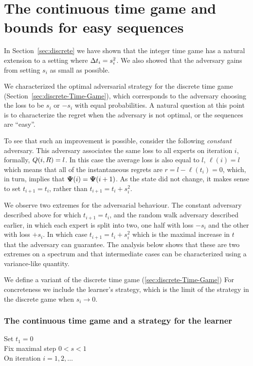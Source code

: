 \documentclass{article}[12pt]
\begin{document}
\section{The continuous time game and bounds for easy sequences} \label{sec:easy}
In Section~\ref{sec:discrete} we have shown that the integer time game
has a natural extension to a setting where $\Delta t_i = s_i^2$. We
also showed that the adversary gains from setting $s_i$ as small as
possible.

We characterized the optimal adversarial strategy for the discrete
time game (Section~\ref{sec:discrete-Time-Game}), which corresponds
to the adversary choosing the loss to be $s_i$ or $-s_i$ with equal
probabilities. A natural question at this point is to characterize the
regret when the adversary is not optimal, or the sequences are ``easy''.

To see that such an improvement is possible, consider the following
{\em constant} adversary. This adversary associates the same loss to
all experts on iteration $i$, formally, $Q(i,R) = l$. In this
case the average loss is also equal to $l$, $\ell(i)=l$ which means
that all of the instantaneous regrets are $r=l-\ell(t_i) = 0$, which,
in turn, implies that ${\bf \Psi}(i) = {\bf \Psi}(i+1)$. As the state did not
change, it makes sense to set $t_{i+1}=t_i$, rather than
$t_{i+1}=t_i+s_i^2$.

We observe two extremes for the adversarial behaviour. The constant
adversary described above for which $t_{i+1} = t_i$, and the random walk adversary described
earlier, in which each expert is split into two, one half with loss
$-s_i$ and the other with loss $+s_i$. In which case $t_{i+1} =
t_i+s_i^2$ which is the maximal increase in $t$ that the adversary can
guarantee. The analysis below shows that these are two extremes on a
spectrum and that intermediate cases can be characterized using a
variance-like quantity.

We define a variant of the discrete time game
(\ref{sec:discrete-Time-Game}) For concreteness we include the
learner's strategy, which is the limit of the strategy in the discrete
game when $s_i \to 0$.

\subsubsection{The continuous time game and a strategy for the learner}
\label{sec:contin-Time-Game}
Set $t_1=0$ \\
Fix maximal step $0<s<1$ \\
On iteration $i=1,2,\ldots$
\end{document}
